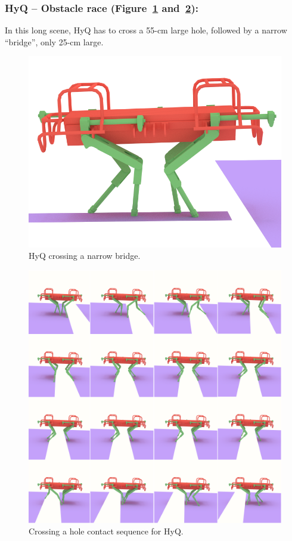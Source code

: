 \subsubsection{HyQ -- Obstacle race (Figure~\ref{fig:HyQ_bridge} and~\ref{fig:HyQ_obs}):}
In this long scene, HyQ has to cross a 55-cm large hole, followed by a narrow ``bridge'', only 25-cm large.

\begin{figure}
  \centering
  \includegraphics[width=0.4\linewidth]{figures/HyQ_bridge}
  \caption{
           HyQ crossing a narrow bridge. }
		   \label{fig:HyQ_bridge}
\end{figure}

\begin{figure}
  \centering
  \includegraphics[width=1\linewidth]{figures/HyQ_obs}
  \caption{
           Crossing a hole contact sequence for HyQ. }
		   \label{fig:HyQ_obs}
\end{figure}



